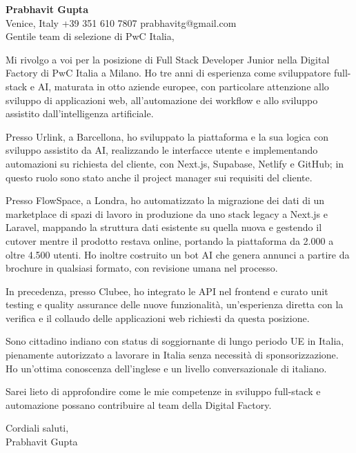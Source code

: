 \documentclass[a4paper,10.5pt]{article}
\begin{document}
\textbf{Prabhavit Gupta}\\
Venice, Italy \textbar{} +39 351 610 7807 \textbar{} prabhavitg@gmail.com\\[10pt]
Gentile team di selezione di PwC Italia,

Mi rivolgo a voi per la posizione di Full Stack Developer Junior nella Digital Factory di PwC Italia a Milano. Ho tre anni di esperienza come sviluppatore full-stack e AI, maturata in otto aziende europee, con particolare attenzione allo sviluppo di applicazioni web, all'automazione dei workflow e allo sviluppo assistito dall'intelligenza artificiale.

Presso Urlink, a Barcellona, ho sviluppato la piattaforma e la sua logica con sviluppo assistito da AI, realizzando le interfacce utente e implementando automazioni su richiesta del cliente, con Next.js, Supabase, Netlify e GitHub; in questo ruolo sono stato anche il project manager sui requisiti del cliente.

Presso FlowSpace, a Londra, ho automatizzato la migrazione dei dati di un marketplace di spazi di lavoro in produzione da uno stack legacy a Next.js e Laravel, mappando la struttura dati esistente su quella nuova e gestendo il cutover mentre il prodotto restava online, portando la piattaforma da 2.000 a oltre 4.500 utenti. Ho inoltre costruito un bot AI che genera annunci a partire da brochure in qualsiasi formato, con revisione umana nel processo.

In precedenza, presso Clubee, ho integrato le API nel frontend e curato unit testing e quality assurance delle nuove funzionalit\`a, un'esperienza diretta con la verifica e il collaudo delle applicazioni web richiesti da questa posizione.

Sono cittadino indiano con status di soggiornante di lungo periodo UE in Italia, pienamente autorizzato a lavorare in Italia senza necessit\`a di sponsorizzazione. Ho un'ottima conoscenza dell'inglese e un livello conversazionale di italiano.

Sarei lieto di approfondire come le mie competenze in sviluppo full-stack e automazione possano contribuire al team della Digital Factory.

Cordiali saluti,\\
Prabhavit Gupta
\end{document}
